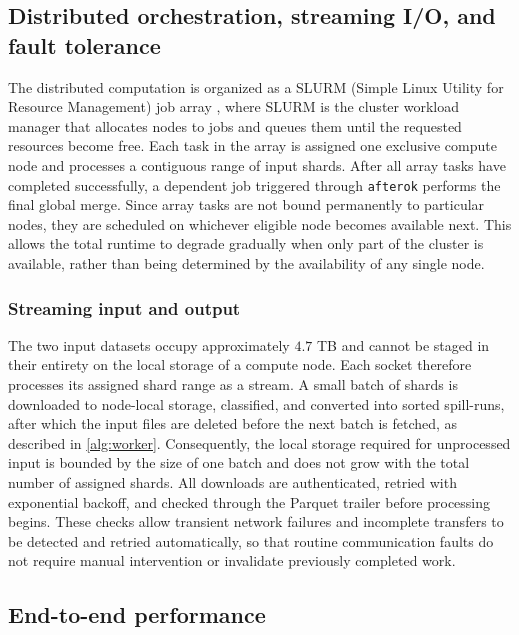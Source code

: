 \documentclass[appliedmath,article,submit,moreauthors]{Definitions/mdpi}
\begin{document}
\subsection{Distributed orchestration, streaming I/O, and fault tolerance}
\label{sec:pipe-dist}

The distributed computation is organized as a SLURM (Simple Linux Utility for
Resource Management) job array \cite{SLURM}, where SLURM is the cluster workload
manager that allocates nodes to jobs and queues them until the requested
resources become free. Each task in the array is assigned one exclusive compute
node and processes a contiguous range of input shards. After all array tasks
have completed successfully, a dependent job triggered through \texttt{afterok}
performs the final global merge. Since array tasks are not bound permanently to
particular nodes, they are scheduled on whichever eligible node becomes
available next. This allows the total runtime to degrade gradually when only
part of the cluster is available, rather than being determined by the
availability of any single node.

\subsubsection{Streaming input and output}

The two input datasets occupy approximately \(4.7\) TB and cannot be staged in
their entirety on the local storage of a compute node. Each socket therefore
processes its assigned shard range as a stream. A small batch of shards is
downloaded to node-local storage, classified, and converted into sorted
spill-runs, after which the input files are deleted before the next batch is
fetched, as described in \cref{alg:worker}. Consequently, the local storage
required for unprocessed input is bounded by the size of one batch and does not
grow with the total number of assigned shards.
All downloads are authenticated, retried with exponential backoff, and checked
through the Parquet trailer before processing begins. These checks allow
transient network failures and incomplete transfers to be detected and retried
automatically, so that routine communication faults do not require manual
intervention or invalidate previously completed work.

\subsection{End-to-end performance}
\label{sec:pipe-perf}
\end{document}

